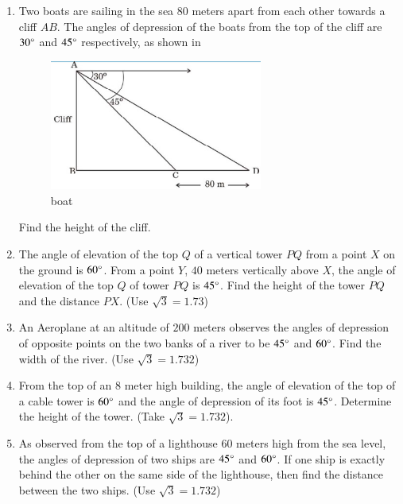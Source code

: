 \begin{enumerate}[label=\thesubsection.\arabic*.,ref=\thesubsection.\theenumi]
    \hfill{}\item Two boats are sailing in the sea $80$ meters apart from each other towards a cliff $AB$. The angles of depression of the boats from the top of the cliff are $30\degree$ and $45\degree$ respectively, as shown in 
    
    \begin{figure}[H]
        \centering
        \includegraphics[width=70mm]{cbse/figs/boat.edit.jpeg}
        \caption{boat}
        \label{fig:boat.jpeg}
    \end{figure}
    
    Find the height of the cliff.
    
    \hfill{}\item The angle of elevation of the top $Q$ of a vertical tower $PQ$ from a point $X$ on the ground is $60\degree$. From a point $Y$, $40$ meters vertically above $X$, the angle of elevation of the top $Q$ of tower $PQ$ is $45\degree$. Find the height of the tower $PQ$ and the distance $PX$. (Use $\sqrt{3} = 1.73$)
    
    \hfill{}\item An Aeroplane at an altitude of $200$ meters observes the angles of depression of opposite points on the two banks of a river to be $45\degree$ and $60\degree$. Find the width of the river. (Use $\sqrt{3} = 1.732$)
    
    \hfill{}\item From the top of an $8$ meter high building, the angle of elevation of the top of a cable tower is $60\degree$ and the angle of depression of its foot is $45\degree$. Determine the height of the tower. (Take $\sqrt{3} = 1.732$).
    
    \hfill{}\item As observed from the top of a lighthouse $60$ meters high from the sea level, the angles of depression of two ships are $45\degree$ and $60\degree$. If one ship is exactly behind the other on the same side of the lighthouse, then find the distance between the two ships. (Use $\sqrt{3} = 1.732$)
    

\end{enumerate}
